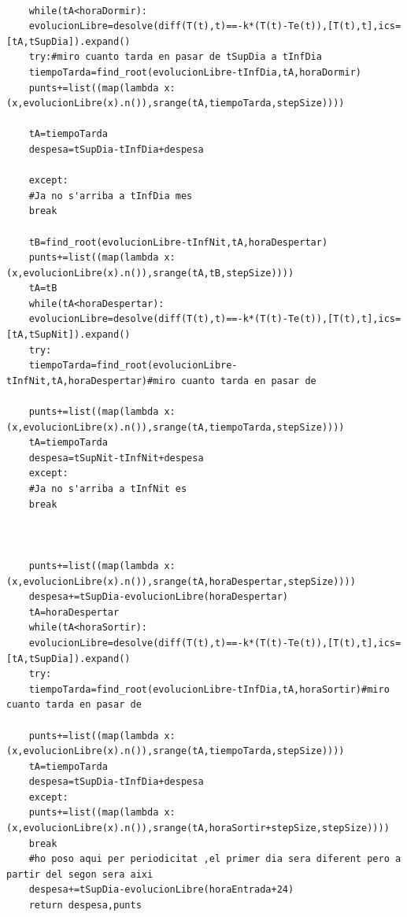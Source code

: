 \documentclass[11pt]{article}
\begin{document}
\begin{lstlisting}[language=iPython]
	
	while(tA<horaDormir):
	evolucionLibre=desolve(diff(T(t),t)==-k*(T(t)-Te(t)),[T(t),t],ics=[tA,tSupDia]).expand()
	try:#miro cuanto tarda en pasar de tSupDia a tInfDia
	tiempoTarda=find_root(evolucionLibre-tInfDia,tA,horaDormir)
	punts+=list((map(lambda x:(x,evolucionLibre(x).n()),srange(tA,tiempoTarda,stepSize))))
	
	tA=tiempoTarda
	despesa=tSupDia-tInfDia+despesa
	
	except:
	#Ja no s'arriba a tInfDia mes
	break
	
	tB=find_root(evolucionLibre-tInfNit,tA,horaDespertar)
	punts+=list((map(lambda x:(x,evolucionLibre(x).n()),srange(tA,tB,stepSize))))
	tA=tB
	while(tA<horaDespertar):
	evolucionLibre=desolve(diff(T(t),t)==-k*(T(t)-Te(t)),[T(t),t],ics=[tA,tSupNit]).expand()
	try:
	tiempoTarda=find_root(evolucionLibre-tInfNit,tA,horaDespertar)#miro cuanto tarda en pasar de 
	
	punts+=list((map(lambda x:(x,evolucionLibre(x).n()),srange(tA,tiempoTarda,stepSize))))
	tA=tiempoTarda
	despesa=tSupNit-tInfNit+despesa
	except:
	#Ja no s'arriba a tInfNit es
	break    
	
	
	
	punts+=list((map(lambda x:(x,evolucionLibre(x).n()),srange(tA,horaDespertar,stepSize))))
	despesa+=tSupDia-evolucionLibre(horaDespertar)
	tA=horaDespertar
	while(tA<horaSortir):
	evolucionLibre=desolve(diff(T(t),t)==-k*(T(t)-Te(t)),[T(t),t],ics=[tA,tSupDia]).expand()
	try:
	tiempoTarda=find_root(evolucionLibre-tInfDia,tA,horaSortir)#miro cuanto tarda en pasar de 
	
	punts+=list((map(lambda x:(x,evolucionLibre(x).n()),srange(tA,tiempoTarda,stepSize))))
	tA=tiempoTarda
	despesa=tSupDia-tInfDia+despesa
	except:
	punts+=list((map(lambda x:(x,evolucionLibre(x).n()),srange(tA,horaSortir+stepSize,stepSize))))
	break
	#ho poso aqui per periodicitat ,el primer dia sera diferent pero a partir del segon sera aixi
	despesa+=tSupDia-evolucionLibre(horaEntrada+24) 
	return despesa,punts
\end{lstlisting}
\end{document}
